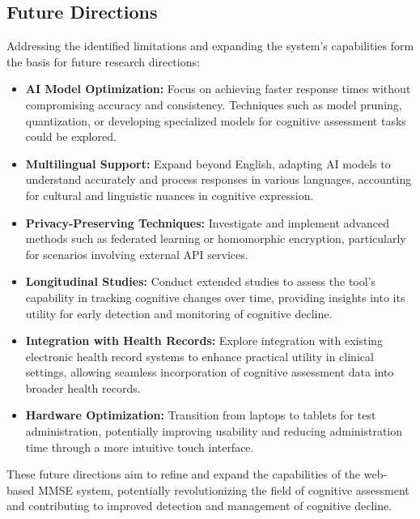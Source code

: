 \subsection{Future Directions}

Addressing the identified limitations and expanding the system's capabilities form the basis for future research directions:

\begin{itemize}
    \item \textbf{AI Model Optimization:} Focus on achieving faster response times without compromising accuracy and consistency. Techniques such as model pruning, quantization, or developing specialized models for cognitive assessment tasks could be explored.
    
    \item \textbf{Multilingual Support:} Expand beyond English, adapting AI models to understand accurately and process responses in various languages, accounting for cultural and linguistic nuances in cognitive expression.
    
    \item \textbf{Privacy-Preserving Techniques:} Investigate and implement advanced methods such as federated learning or homomorphic encryption, particularly for scenarios involving external API services.
    
    \item \textbf{Longitudinal Studies:} Conduct extended studies to assess the tool's capability in tracking cognitive changes over time, providing insights into its utility for early detection and monitoring of cognitive decline.
    
    \item \textbf{Integration with Health Records:} Explore integration with existing electronic health record systems to enhance practical utility in clinical settings, allowing seamless incorporation of cognitive assessment data into broader health records.
        
    \item \textbf{Hardware Optimization:} Transition from laptops to tablets for test administration, potentially improving usability and reducing administration time through a more intuitive touch interface.
\end{itemize}

These future directions aim to refine and expand the capabilities of the web-based MMSE system, potentially revolutionizing the field of cognitive assessment and contributing to improved detection and management of cognitive decline.